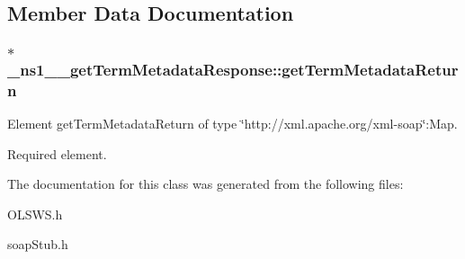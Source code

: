 \subsection{Member Data Documentation}
\hypertarget{class__ns1____getTermMetadataResponse_a3d673b73f83838e01b2fd182b60f4df2}{
\subsubsection[{getTermMetadataReturn}]{$\ast$ {\bf \_\-ns1\_\-\_\-getTermMetadataResponse::getTermMetadataReturn}}}
\label{class__ns1____getTermMetadataResponse_a3d673b73f83838e01b2fd182b60f4df2}


Element getTermMetadataReturn of type \char`\"{}http://xml.apache.org/xml-\/soap\char`\"{}:Map. 

Required element. 

The documentation for this class was generated from the following files:\begin{DoxyCompactItemize}
\item 
OLSWS.h\item 
soapStub.h\end{DoxyCompactItemize}
